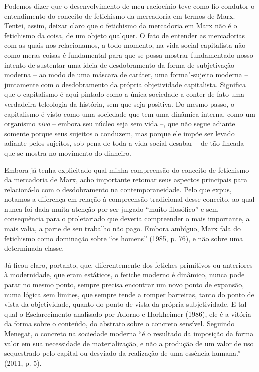 {Podemos dizer que o desenvolvimento de meu raciocínio teve como fio
condutor o entendimento do conceito de fetichismo da mercadoria em
termos de Marx. Tentei, assim, deixar claro que o fetichismo da
mercadoria em Marx não é o fetichismo da coisa, de um objeto qualquer. O
fato de entender as mercadorias com as quais nos relacionamos, a todo
momento, na vida social capitalista não como meras coisas é fundamental
para que se possa mostrar fundamentado nosso intento de sustentar uma
ideia de desdobramento da forma de subjetivação moderna -- ao modo de
uma máscara de caráter, uma forma"-sujeito moderna -- juntamente com o
desdobramento da própria objetividade capitalista. Significa que o
capitalismo é aqui pintado como a única sociedade a conter de fato
uma verdadeira teleologia da história, sem que seja positiva. Do mesmo
passo, o capitalismo é visto como uma sociedade que tem uma dinâmica
interna, como um organismo \emph{vivo} -- embora seu núcleo seja sem
vida --, que não segue adiante somente porque seus sujeitos o conduzem,
mas porque ele impõe ser levado adiante pelos sujeitos, sob pena de toda
a vida social desabar -- de tão fincada que se mostra no movimento do
dinheiro.

Embora já tenha explicitado qual minha compreensão do conceito de
fetichismo da mercadoria de Marx, acho importante retomar seus
aspectos principais para relacioná-lo com o desdobramento na
contemporaneidade. Pelo que expus, notamos a diferença em relação à
compreensão tradicional desse conceito, ao qual nunca foi dada muita
atenção por ser julgado ``muito filosófico'' e sem consequência para o
proletariado que deveria compreender o mais importante, a mais valia, a
parte de seu trabalho não pago. Embora ambíguo, Marx fala do fetichismo
como dominação sobre ``os homens'' (1985, p. 76), e não sobre uma
determinada classe.

Já ficou claro, portanto, que, diferentemente dos fetiches primitivos
ou anteriores à modernidade, que eram estáticos, o fetiche moderno é
dinâmico, nunca pode parar no mesmo ponto, sempre precisa encontrar um
novo ponto de expansão, numa lógica sem limites, que sempre tende a
romper barreiras, tanto do ponto de vista da objetividade, quanto do
ponto de vista da própria subjetividade. E tal qual o Esclarecimento
analisado por Adorno e Horkheimer (1986), ele é a vitória da forma sobre
o conteúdo, do abstrato sobre o concreto sensível. Seguindo Menegat, o
concreto na sociedade moderna ``é o resultado da imposição da forma
valor em sua necessidade de materialização, e não a produção de um valor
de uso sequestrado pelo capital ou desviado da realização de uma
essência humana.'' (2011, p. 5).

}
